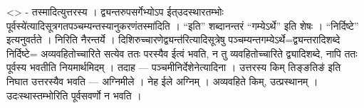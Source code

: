 \textless{}\textgreater{} - तस्मादित्युत्तरस्य । द्व्यन्तरुपसर्गेभ्योऽप
ईत्उदस्थारतम्भोः पूर्वस्ये॑त्यादिसूत्रगतपञ्चम्यन्तस्यानुकरणंतस्मा॑दिति ।
``इति'' शब्दानन्तरं ``गम्येऽर्थे'' इति शेषः । ``निर्दिष्टे''
इत्यनुवर्तते । निरिति नैरन्तर्ये ।
दिशिरुच्चारणेद्व्यन्त॑रित्यादिसूत्रेषु
पञ्चम्यन्तगम्येऽर्थे=द्व्यन्तरादिशब्दे निर्दिष्टे= अव्यवहितोच्चारिते
सत्येव ततः परस्यैव ईत्वं भवति, न तु व्यवहितोच्चारिते द्व्यादिशब्दे, नापि
ततः पूर्वस्य भवतीति नियमार्थमिदम् । तदाह --- पञ्चमीनिर्देशेनेत्यादिना ।
उत्तरस्य किम् तिङ्ङतिङ॑ इति निघात उत्तरस्यैव भवति --- अग्निमीले । नेह
ईले अग्निम् । अव्यवहिते किम्, उत्प्रस्थानम् । उदःस्थास्तम्भोरिति
पूर्वसवर्णो न भवति ।
